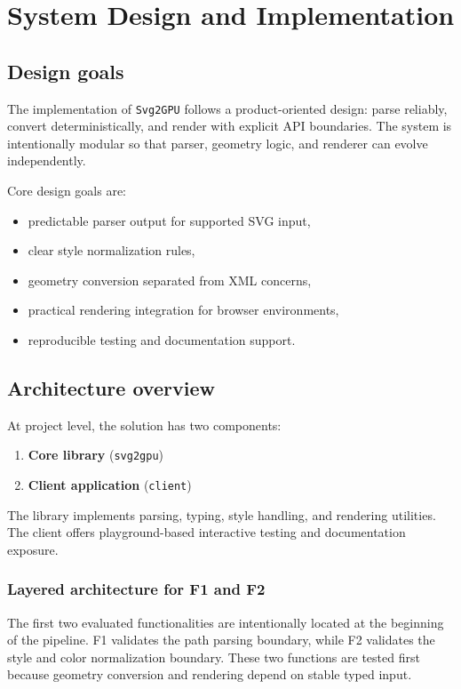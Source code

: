 \chapter{System Design and Implementation}
\label{chap:system_design}

\section{Design goals}

The implementation of \texttt{Svg2GPU} follows a product-oriented design: parse reliably, convert deterministically, and render with explicit API boundaries.
The system is intentionally modular so that parser, geometry logic, and renderer can evolve independently.

Core design goals are:

\begin{itemize}
\item predictable parser output for supported SVG input,
\item clear style normalization rules,
\item geometry conversion separated from XML concerns,
\item practical rendering integration for browser environments,
\item reproducible testing and documentation support.
\end{itemize}

\section{Architecture overview}

At project level, the solution has two components:

\begin{enumerate}
\item \textbf{Core library} (\texttt{svg2gpu})
\item \textbf{Client application} (\texttt{client})
\end{enumerate}

The library implements parsing, typing, style handling, and rendering utilities.
The client offers playground-based interactive testing and documentation exposure.

\subsection{Layered architecture for F1 and F2}

The first two evaluated functionalities are intentionally located at the beginning of the pipeline.
F1 validates the path parsing boundary, while F2 validates the style and color normalization boundary.
These two functions are tested first because geometry conversion and rendering depend on stable typed input.

